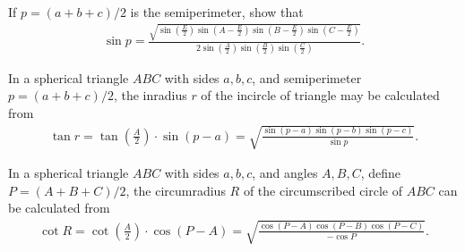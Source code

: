 \begin{tcolorbox}[title={Exercises on Spherical Excess $E$}]
\begin{question}
    If $p=(a+b+c)/2$ is the semiperimeter, show that
    \begin{align*}
        \sin p = \frac{\displaystyle \sqrt{\sin\left(\frac{E}{2}\right)\sin\left(A-\frac{E}{2}\right)\sin\left(B-\frac{E}{2}\right)\sin\left(C-\frac{E}{2}\right)}}{\displaystyle 2\sin\left(\frac{A}{2}\right)\sin\left(\frac{B}{2}\right)\sin\left(\frac{C}{2}\right)}.
    \end{align*}
\end{question}


\end{tcolorbox}

\begin{tcolorbox}[title={Radii of the Spherical Triangle}]
    \begin{question}[name={Inradius of the Spherical Triangle}]
        In a spherical triangle $ABC$ with sides $a,b,c$, and semiperimeter $p=(a+b+c)/2$, the inradius $r$ of the incircle of triangle may be calculated from
        \begin{align*}
            \tan r = \tan\left(\frac{A}{2}\right)\cdot \sin(p-a) = \sqrt{\frac{\sin(p-a)\sin(p-b)\sin(p-c)}{\sin p}}.
        \end{align*}
    \end{question}
    \begin{question}[name={Circumradius of the Spherical Triangle}]
        In a spherical triangle $ABC$ with sides $a,b,c$, and angles $A,B,C$, define $P=(A+B+C)/2$, the circumradius $R$ of the circumscribed circle of $ABC$ can be calculated from
        \begin{align*}
            \cot R = \cot\left(\frac{A}{2}\right)\cdot \cos(P-A) = \sqrt{\frac{\cos(P-A)\cos(P-B)\cos(P-C)}{-\cos P}}.
        \end{align*}
    \end{question}
\end{tcolorbox}

